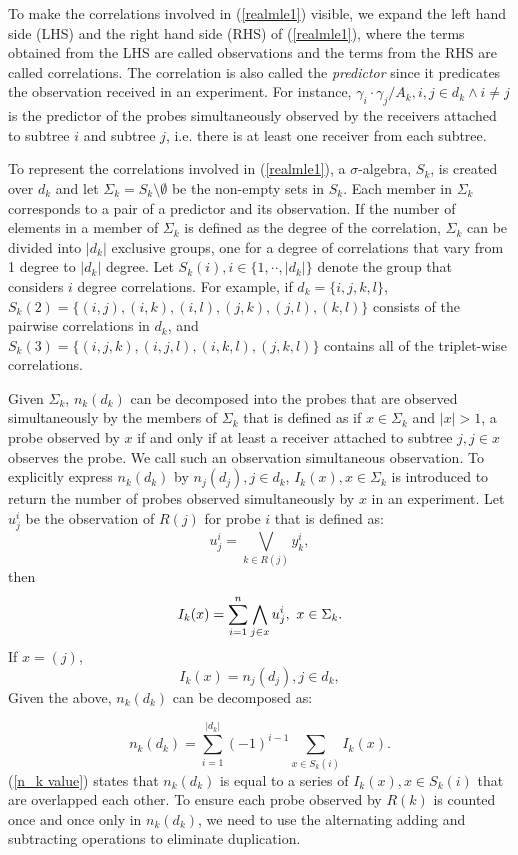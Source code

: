 \documentclass[10pt,onecolumn]{IEEEtran}
\begin{document}
 To make the correlations involved in (\ref{realmle1}) visible,  we expand  the left hand side (LHS) and the right hand side (RHS) of  (\ref{realmle1}), where the terms obtained from the LHS are called observations and the terms from the RHS are called correlations. The correlation is also called  the {\it predictor} since it predicates the observation received in an experiment.  For instance, $\gamma_i\cdot \gamma_j/A_k, i, j \in d_k \land i \neq j$ is the predictor of the probes simultaneously observed by the receivers attached to subtree $i$ and subtree $j$, i.e. there is at least one receiver from each subtree. 

To represent the correlations involved in (\ref{realmle1}),
 a $\sigma$-algebra, $S_k$, is created over $d_k$ and  let $\Sigma_k=S_k \setminus \emptyset$ be the non-empty sets in $S_k$. Each member in $\Sigma_k$ corresponds to a pair of a predictor and its observation.  If  the number of elements in a member of $\Sigma_k$ is defined as the degree of the correlation, $\Sigma_k$ can be divided into $|d_k|$ exclusive groups, one for
 a degree of correlations that vary from 1 degree to $|d_k|$ degree. Let $S_k(i), i \in \{1,\cdot\cdot,|d_k|\}$ denote the group that considers $i$ degree correlations. For example, if $d_k=\{i,j,k,l\}$, $S_k(2)=\{(i,j),(i,k),(i,l),(j,k),(j,l),(k,l)\}$ consists of the pairwise correlations in $d_k$, and $S_k(3)=\{(i,j,k),(i,j,l),(i,k,l),(j,k,l)\}$ contains all of the triplet-wise correlations.


Given $\Sigma_k$,  $n_k(d_k)$ can be decomposed into the probes that are observed simultaneously by the members of  $\Sigma_k$ that is defined as if $x \in \Sigma_k$ and $|x|>1$, a probe observed by $x$  if and only if at least a receiver attached to subtree $j, j \in x$ observes the probe. We call such an observation simultaneous observation.
 To explicitly express $n_k(d_k)$ by $n_j(d_j), j \in d_k$,  $I_k(x), x \in \Sigma_k$ is introduced to return  the number of probes observed simultaneously by  $x$ in an experiment.
Let $u_j^i$ be the observation of $R(j)$ for probe $i$ that is defined as:
\[
u_j^i=\bigvee_{k \in R(j)} y_k^i,
\]
then
\begin{equation}
I_k(x)=\sum_{i=1}^n \bigwedge_{j \in x} u_j^i, \mbox{\vspace{1cm} } x \in \Sigma_k.
\label{I-k x}
\end{equation}
If $x=(j)$,
\[
I_k(x)=n_j(d_j), j \in d_k,
\]
Given the above, $n_k(d_k)$ can be decomposed as:

\begin{equation}
n_k(d_k)=\sum_{i=1}^{|d_k|}(-1)^{i-1}\sum_{x \in S_k(i)} I_k(x). \label{n_k value}
\end{equation}
(\ref{n_k value}) states that $n_k(d_k)$ is equal to a series of $I_k(x), x \in S_k(i)$ that are overlapped each other. To ensure each probe observed by $R(k)$ is counted once and once only in $n_k(d_k)$, we need to use the alternating adding and subtracting operations to eliminate duplication.
\end{document}
